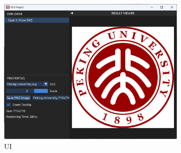 \documentclass[UTF8]{ctexart}
\begin{document}
\begin{figure}[H]
    \centering
    \begin{subfigure}[b]{0.9\textwidth}
        \centering
        \includegraphics[width=\textwidth]{images/Screenshot.png}
        \caption{UI}
    \end{subfigure}
    \par\bigskip
    \begin{subfigure}[b]{0.3\textwidth}
        \centering

\end{subfigure}
\end{figure}
\end{document}
